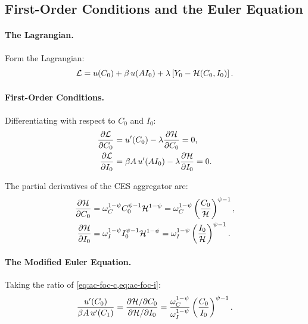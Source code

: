 \subsection{First-Order Conditions and the Euler Equation}
\label{subsec:ac-foc}

\paragraph{The Lagrangian.}
Form the Lagrangian:
\begin{equation}
\mathcal{L} = u(C_0) + \beta \, u(A I_0) + \lambda \left[ Y_0 - \mathcal{H}(C_0, I_0) \right].
\label{eq:ac-lagrangian}
\end{equation}

\paragraph{First-Order Conditions.}
Differentiating with respect to $C_0$ and $I_0$:
\begin{align}
\frac{\partial \mathcal{L}}{\partial C_0} &= u'(C_0) - \lambda \frac{\partial \mathcal{H}}{\partial C_0} = 0, \label{eq:ac-foc-c} \\
\frac{\partial \mathcal{L}}{\partial I_0} &= \beta A \, u'(A I_0) - \lambda \frac{\partial \mathcal{H}}{\partial I_0} = 0. \label{eq:ac-foc-i}
\end{align}

The partial derivatives of the CES aggregator are:
\begin{align}
\frac{\partial \mathcal{H}}{\partial C_0} &= \omega_C^{1-\psi} C_0^{\psi-1} \mathcal{H}^{1-\psi} = \omega_C^{1-\psi} \left( \frac{C_0}{\mathcal{H}} \right)^{\psi-1}, \label{eq:ac-dH-dC} \\
\frac{\partial \mathcal{H}}{\partial I_0} &= \omega_I^{1-\psi} I_0^{\psi-1} \mathcal{H}^{1-\psi} = \omega_I^{1-\psi} \left( \frac{I_0}{\mathcal{H}} \right)^{\psi-1}. \label{eq:ac-dH-dI}
\end{align}

\paragraph{The Modified Euler Equation.}
Taking the ratio of \cref{eq:ac-foc-c,eq:ac-foc-i}:
\begin{equation}
\frac{u'(C_0)}{\beta A \, u'(C_1)} = \frac{\partial \mathcal{H} / \partial C_0}{\partial \mathcal{H} / \partial I_0} = \frac{\omega_C^{1-\psi}}{\omega_I^{1-\psi}} \left( \frac{C_0}{I_0} \right)^{\psi-1}.
\label{eq:ac-euler-ratio}
\end{equation}

